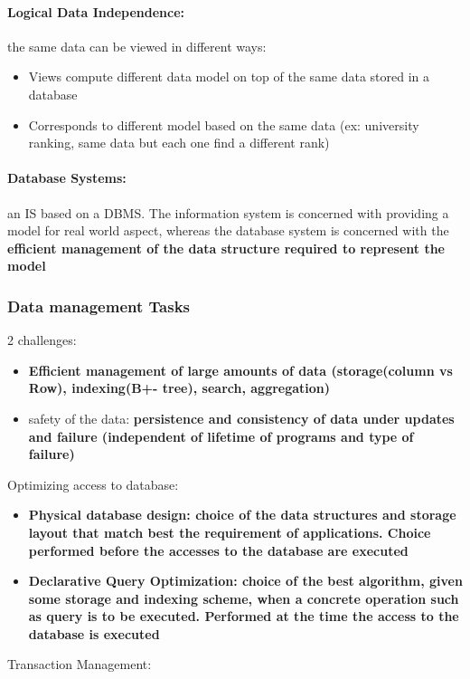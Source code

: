 \paragraph{Logical Data Independence:} the same data can be viewed in different ways:
\begin{itemize}
	\item Views compute different data model on top of the same data stored in a database
	\item Corresponds to different model based on the same data (ex: university ranking, same data but each one find a different rank)
\end{itemize} 

\paragraph{Database Systems:} an IS based on a DBMS. The information system is concerned with providing a model for real world aspect, whereas the database system is concerned with the \bf{efficient management of the data structure required to represent the model}



\subsubsection{Data management Tasks}
2 challenges:
\begin{itemize}
	\item \bf{Efficient} management of large amounts of data (storage(column vs Row), indexing(B+- tree), search, aggregation)
	\item safety of the data: \bf{persistence } and \bf{consistency} of data under updates and failure (independent of lifetime of programs and type of failure)
\end{itemize}
Optimizing access to database:

\begin{itemize}
	\item \bf{Physical database design:} choice of the data structures and storage layout that match best the requirement of applications. Choice performed before the accesses to the database are executed
	\item \bf{Declarative Query Optimization:} choice of the best algorithm, given some storage and indexing scheme, when a concrete operation such as query is to be executed. Performed at the time the access to the database is executed
\end{itemize}
Transaction Management:

